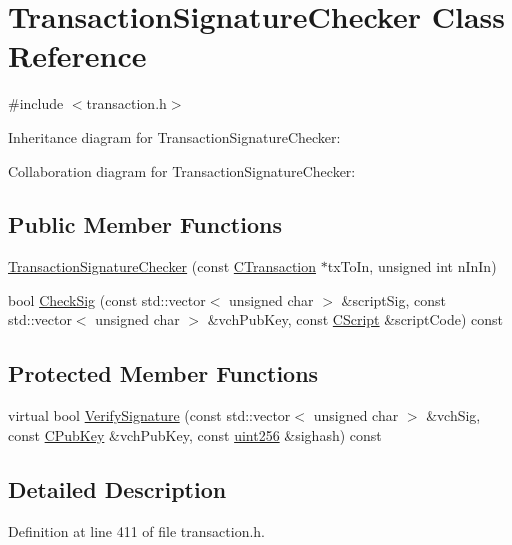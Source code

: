 \hypertarget{class_transaction_signature_checker}{}\section{Transaction\+Signature\+Checker Class Reference}
\label{class_transaction_signature_checker}


{\ttfamily \#include $<$transaction.\+h$>$}



Inheritance diagram for Transaction\+Signature\+Checker\+:


Collaboration diagram for Transaction\+Signature\+Checker\+:
\subsection*{Public Member Functions}
\begin{DoxyCompactItemize}
\item 
\hyperlink{class_transaction_signature_checker_ab1e6927dad48bb5ae8109acdb39eaf56}{Transaction\+Signature\+Checker} (const \hyperlink{class_c_transaction}{C\+Transaction} $\ast$tx\+To\+In, unsigned int n\+In\+In)
\item 
bool \hyperlink{class_transaction_signature_checker_a6d9044dff84be9a2c2233fdf1508f9ab}{Check\+Sig} (const std\+::vector$<$ unsigned char $>$ \&script\+Sig, const std\+::vector$<$ unsigned char $>$ \&vch\+Pub\+Key, const \hyperlink{class_c_script}{C\+Script} \&script\+Code) const 
\end{DoxyCompactItemize}
\subsection*{Protected Member Functions}
\begin{DoxyCompactItemize}
\item 
virtual bool \hyperlink{class_transaction_signature_checker_a59179724477a42488a70a2828f51093d}{Verify\+Signature} (const std\+::vector$<$ unsigned char $>$ \&vch\+Sig, const \hyperlink{class_c_pub_key}{C\+Pub\+Key} \&vch\+Pub\+Key, const \hyperlink{classuint256}{uint256} \&sighash) const 
\end{DoxyCompactItemize}


\subsection{Detailed Description}


Definition at line 411 of file transaction.\+h.



